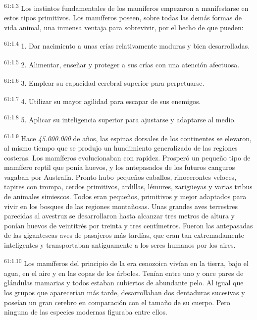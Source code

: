 \par
\textsuperscript{61:1.3} Los instintos fundamentales de los mamíferos empezaron a manifestarse en estos tipos primitivos. Los mamíferos poseen, sobre todas las demás formas de vida animal, una inmensa ventaja para sobrevivir, por el hecho de que pueden:

\par
\textsuperscript{61:1.4} 1. Dar nacimiento a unas crías relativamente maduras y bien desarrolladas.

\par
\textsuperscript{61:1.5} 2. Alimentar, enseñar y proteger a sus crías con una atención afectuosa.

\par
\textsuperscript{61:1.6} 3. Emplear su capacidad cerebral superior para perpetuarse.

\par
\textsuperscript{61:1.7} 4. Utilizar su mayor agilidad para escapar de sus enemigos.

\par
\textsuperscript{61:1.8} 5. Aplicar su inteligencia superior para ajustarse y adaptarse al medio.

\par
\textsuperscript{61:1.9} Hace \textit{45.000.000} de años, las espinas dorsales de los continentes se elevaron, al mismo tiempo que se produjo un hundimiento generalizado de las regiones costeras. Los mamíferos evolucionaban con rapidez. Prosperó un pequeño tipo de mamífero reptil que ponía huevos, y los antepasados de los futuros canguros vagaban por Australia. Pronto hubo pequeños caballos, rinocerontes veloces, tapires con trompa, cerdos primitivos, ardillas, lémures, zarig\"ueyas y varias tribus de animales simiescos. Todos eran pequeños, primitivos y mejor adaptados para vivir en los bosques de las regiones montañosas. Unas grandes aves terrestres parecidas al avestruz se desarrollaron hasta alcanzar tres metros de altura y ponían huevos de veintitrés por treinta y tres centímetros. Fueron las antepasadas de las gigantescas aves de pasajeros más tardías, que eran tan extremadamente inteligentes y transportaban antiguamente a los seres humanos por los aires.

\par
\textsuperscript{61:1.10} Los mamíferos del principio de la era cenozoica vivían en la tierra, bajo el agua, en el aire y en las copas de los árboles. Tenían entre uno y once pares de glándulas mamarias y todos estaban cubiertos de abundante pelo. Al igual que los grupos que aparecerían más tarde, desarrollaban dos dentaduras sucesivas y poseían un gran cerebro en comparación con el tamaño de su cuerpo. Pero ninguna de las especies modernas figuraba entre ellos.

